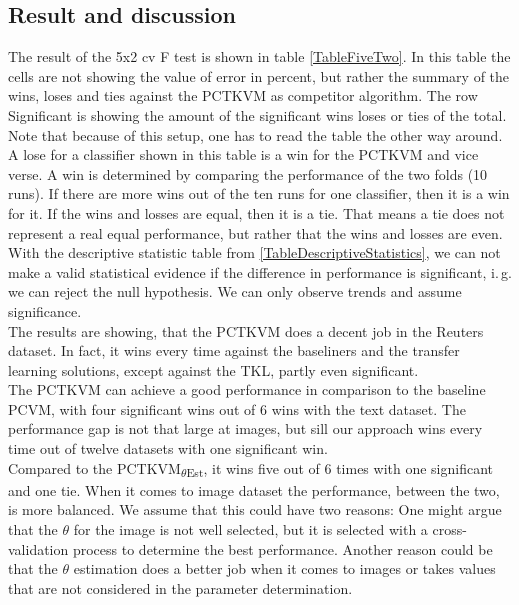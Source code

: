 \subsection{Result and discussion}\label{EmSubSecResOneDa}
The result of the 5x2 cv F test is shown in table \ref{TableFiveTwo}.
In this table the cells are not showing the value of error in percent, but rather the summary of the wins,  loses and ties against the \acs{PCTKVM} as competitor algorithm.
The row Significant is showing the amount of the significant wins loses or ties of the total.
Note that because of this setup, one has to read the table the other way around. 
A lose for a classifier shown in this table is a win for the \acs{PCTKVM} and vice verse. 
A win is determined by comparing the performance of the two folds (10 runs).
If there are more wins out of the ten runs for one classifier, then it is a win for it.
If the wins and losses are equal, then it is a tie. 
That means a tie does not represent a real equal performance, but rather that the wins and losses are even.\\
With the descriptive statistic table from \ref{TableDescriptiveStatistics}, we can not make a valid statistical evidence if the difference in performance is significant, i.\,g. we can reject the null hypothesis.\cite[p. 9]{JanezDemsar.2006}
We can only observe trends and assume significance.\\
The results are showing, that the \acs{PCTKVM} does a decent job in the Reuters dataset.
In fact, it wins every time against the baseliners and the transfer learning solutions, except against the \acs{TKL}, partly even significant.\\
The \acs{PCTKVM} can achieve a good performance in comparison to the baseline \acs{PCVM}, with four significant wins out of 6 wins with the text dataset.
The performance gap is not that large at images, but sill our approach wins every time out of twelve datasets with one significant win.\\
Compared to the \acs{PCTKVM}\textsubscript{$\theta$Est}, it wins five out of 6 times with one significant and one tie. 
When it comes to image dataset the performance, between the two, is more balanced.
We assume that this could have two reasons:
One might argue that the $\theta$ for the image is not well selected, but it is selected with a cross-validation process to determine the best performance. Another reason could be that the $\theta$ estimation does a better job when it comes to images or takes values that are not considered in the parameter determination.\\
